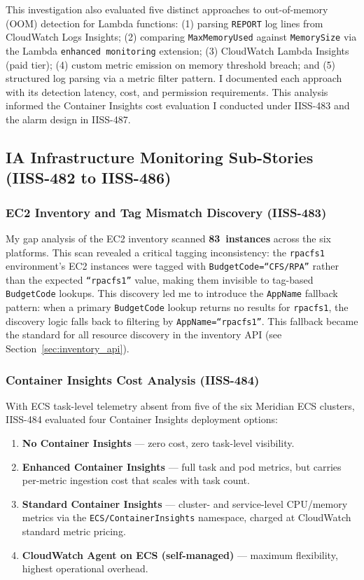 This investigation also evaluated five distinct approaches to out-of-memory
(OOM) detection for Lambda functions: (1) parsing \texttt{REPORT}
log lines from CloudWatch Logs Insights; (2) comparing
\texttt{MaxMemoryUsed} against \texttt{MemorySize} via the Lambda
\texttt{enhanced monitoring} extension; (3) CloudWatch Lambda Insights
(paid tier); (4) custom metric emission on memory threshold breach; and
(5) structured log parsing via a metric filter pattern. I documented each approach
with its detection latency, cost, and permission requirements.
This analysis informed the Container Insights cost evaluation I conducted
under IISS-483 and the alarm design in IISS-487.

\subsection{IA Infrastructure Monitoring Sub-Stories (IISS-482 to IISS-486)}

\subsubsection{EC2 Inventory and Tag Mismatch Discovery (IISS-483)}

My gap analysis of the EC2 inventory scanned \textbf{83~instances} across
the six platforms. This scan revealed a critical tagging
inconsistency: the \texttt{rpacfs1} environment's EC2 instances were
tagged with \texttt{BudgetCode=``CFS/RPA''} rather than the expected
\texttt{``rpacfs1''} value, making them invisible to tag-based
\texttt{BudgetCode} lookups. This discovery led me to introduce the
\texttt{AppName} fallback pattern: when a primary \texttt{BudgetCode}
lookup returns no results for \texttt{rpacfs1}, the discovery logic falls
back to filtering by \texttt{AppName=``rpacfs1''}. This fallback became
the standard for all resource discovery in the inventory API (see
Section~\ref{sec:inventory_api}).

\subsubsection{Container Insights Cost Analysis (IISS-484)}

With ECS task-level telemetry absent from five of the six Meridian ECS
clusters, IISS-484 evaluated four Container Insights deployment options:

\begin{enumerate}
    \item \textbf{No Container Insights} --- zero cost, zero task-level visibility.
    \item \textbf{Enhanced Container Insights} --- full task and pod metrics, but
          carries per-metric ingestion cost that scales with task count.
    \item \textbf{Standard Container Insights} --- cluster- and service-level
          CPU/memory metrics via the \texttt{ECS/ContainerInsights}
          namespace, charged at CloudWatch standard metric pricing.
    \item \textbf{CloudWatch Agent on ECS (self-managed)} --- maximum flexibility,
          highest operational overhead.
\end{enumerate}

